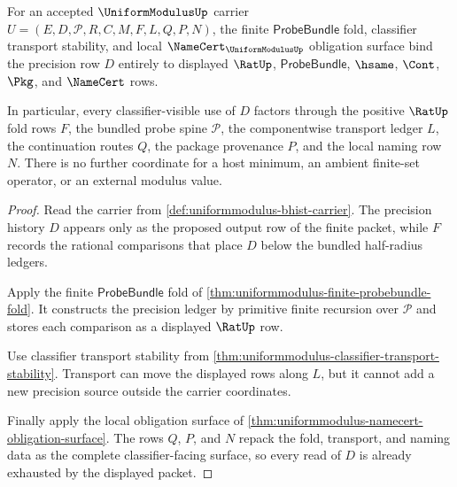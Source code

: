 \begin{theorem}
\label{thm:uniformmodulus-finite-fold-scope-closure}
For an accepted $\UniformModulusUp$ carrier $U=(E,D,\mathcal{P},R,C,M,F,L,Q,P,N)$, the finite $\mathsf{ProbeBundle}$ fold, classifier transport stability, and local $\NameCert_{\UniformModulusUp}$ obligation surface bind the precision row $D$ entirely to displayed $\RatUp$, $\mathsf{ProbeBundle}$, $\hsame$, $\Cont$, $\Pkg$, and $\NameCert$ rows.

In particular, every classifier-visible use of $D$ factors through the positive $\RatUp$ fold rows $F$, the bundled probe spine $\mathcal{P}$, the componentwise transport ledger $L$, the continuation routes $Q$, the package provenance $P$, and the local naming row $N$. There is no further coordinate for a host minimum, an ambient finite-set operator, or an external modulus value.
\end{theorem}
\begin{proof}
Read the carrier from \autoref{def:uniformmodulus-bhist-carrier}. The precision history $D$ appears only as the proposed output row of the finite packet, while $F$ records the rational comparisons that place $D$ below the bundled half-radius ledgers.

Apply the finite $\mathsf{ProbeBundle}$ fold of \autoref{thm:uniformmodulus-finite-probebundle-fold}. It constructs the precision ledger by primitive finite recursion over $\mathcal{P}$ and stores each comparison as a displayed $\RatUp$ row.

Use classifier transport stability from \autoref{thm:uniformmodulus-classifier-transport-stability}. Transport can move the displayed rows along $L$, but it cannot add a new precision source outside the carrier coordinates.

Finally apply the local obligation surface of \autoref{thm:uniformmodulus-namecert-obligation-surface}. The rows $Q$, $P$, and $N$ repack the fold, transport, and naming data as the complete classifier-facing surface, so every read of $D$ is already exhausted by the displayed packet.
\end{proof}

